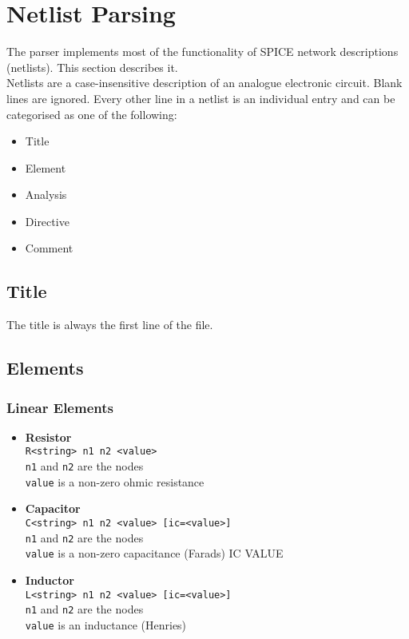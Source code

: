 \section{Netlist Parsing} \label{sec:parse}
The \turmeric parser implements most of the functionality of SPICE network descriptions (netlists). This section describes it.\\

Netlists are a case-insensitive description of an analogue electronic circuit. Blank lines are ignored. Every other line in a \turmeric netlist is an individual entry and can be categorised as one of the following:

\begin{itemize}
    \item Title
    \item Element
    \item Analysis
    \item Directive
    \item Comment
\end{itemize}

\subsection*{Title}
The title is always the first line of the file.

\subsection*{Elements}
\subsubsection*{Linear Elements}
\begin{itemize}
    \item \textbf{Resistor}\\\texttt{R<string> n1 n2 <value>}\\
        \texttt{n1} and \texttt{n2} are the nodes\\
        \texttt{value} is a non-zero ohmic resistance
    \item \textbf{Capacitor}\\
        \texttt{C<string> n1 n2 <value> [ic=<value>]}\\
        \texttt{n1} and \texttt{n2} are the nodes\\
        \texttt{value} is a non-zero capacitance (Farads)
        IC VALUE
    \item \textbf{Inductor}\\
        \texttt{L<string> n1 n2 <value> [ic=<value>]}\\
        \texttt{n1} and \texttt{n2} are the nodes\\
        \texttt{value} is an inductance (Henries)
\end{itemize}
